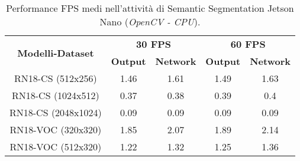 \begin{table}
    \renewcommand{\baselinestretch}{1}
    \centering
    \begin{adjustbox}{max width=\textwidth}
    \begin{tabular}{|c||c|c||c|c||}
        \hline
        \multirow{2}{*}{\bfseries{\Large Modelli-Dataset}} & \multicolumn{2}{c||}{\bfseries{30 FPS}} & \multicolumn{2}{c||}{\bfseries{60 FPS}}\\            & \bfseries{Output} & \bfseries{Network} & \bfseries{Output} & \bfseries{Network}\\
        \hline
        \hline
        RN18-CS (512x256) & 1.46 & 1.61 & 1.49 & 1.63\\
        \hline
        RN18-CS (1024x512) & 0.37 & 0.38 & 0.39 & 0.4\\
        \hline 
        RN18-CS (2048x1024) & 0.09 & 0.09 & 0.09 & 0.09\\
        \hline
        RN18-VOC (320x320) & 1.85 &  2.07 & 1.89 & 2.14\\
        \hline
        RN18-VOC (512x320) & 1.22 & 1.32 & 1.25 & 1.36\\
        \hline
    \end{tabular}
    \end{adjustbox}
    \vspace{0.5cm}
    \caption{Performance FPS medi nell'attività di Semantic Segmentation Jetson Nano (\emph{OpenCV - CPU}).}
    \label{average performance jetson opencv CPU sem_seg}
\end{table}

